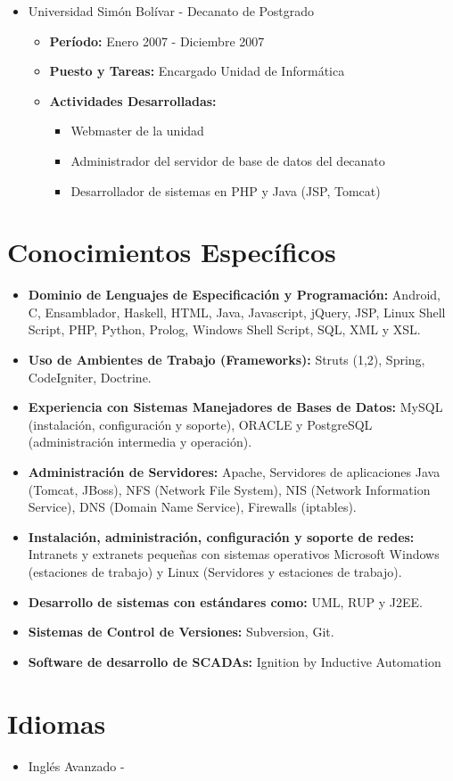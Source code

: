 \documentclass[letterpaper,12pt]{report}
\begin{document}
\begin{itemize}
        \item{Universidad Simón Bolívar - Decanato de Postgrado}
        \begin{itemize}
            \item{\textbf{Período:} Enero 2007 - Diciembre 2007}
            \item{\textbf{Puesto y Tareas:} Encargado Unidad de Informática}
            \item{\textbf{Actividades Desarrolladas:}}
            \begin{itemize}
                \item Webmaster de la unidad
                \item Administrador del servidor de base de datos del decanato
                \item Desarrollador de sistemas en PHP y Java (JSP, Tomcat)
            \end{itemize}
        \end{itemize}

    \end{itemize}


\section{Conocimientos Específicos}

    \begin{itemize}
    \item
    \textbf{Dominio de Lenguajes de Especificación y Programación:} Android, C, Ensamblador, Haskell, HTML, Java, Javascript, jQuery, JSP, Linux Shell Script, PHP, Python, Prolog, Windows Shell Script, SQL, XML y XSL.
    \item
    \textbf{Uso de Ambientes de Trabajo (Frameworks):} Struts (1,2), Spring, CodeIgniter, Doctrine.
    \item
    \textbf{Experiencia con Sistemas Manejadores de Bases de Datos:} MySQL (instalación, configuración y soporte), ORACLE y PostgreSQL (administración intermedia y operación).
    \item
    \textbf{Administración de Servidores:} Apache, Servidores de aplicaciones Java (Tomcat, JBoss), NFS (Network File System), NIS (Network Information Service), DNS (Domain Name Service), Firewalls (iptables).
    \item
    \textbf{Instalación, administración, configuración y soporte de redes:} Intranets y extranets peque\~{n}as con sistemas operativos Microsoft Windows (estaciones de trabajo) y Linux (Servidores y estaciones de trabajo).
    \item
    \textbf{Desarrollo de sistemas con estándares como:} UML, RUP y J2EE.
    \item
    \textbf{Sistemas de Control de Versiones:} Subversion, Git.
    \item
    \textbf{Software de desarrollo de SCADAs:} Ignition by Inductive Automation
    \end{itemize}

\section{Idiomas}
\begin{itemize}
    \item Inglés Avanzado  -
\end{itemize}
\end{document}
